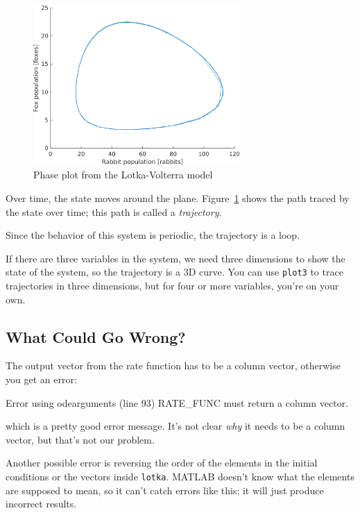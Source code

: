 \begin{figure}[ht]
\centerline{\includegraphics[width=0.7\textwidth]{../code/chap_matrices/lotka_state.png}}
\caption{Phase plot from the Lotka-Volterra model}
\label{fig:phase}
\end{figure}


Over time, the state moves around the plane. Figure~\ref{fig:phase} shows
the path traced by the state over time; this path
is called a \emph{trajectory}.

Since the behavior of this system is periodic, the trajectory is a loop.

If there are three variables in the system, we need three dimensions to show
the state of the system, so the trajectory is a 3D curve.
You can use \lstinline{plot3} to trace trajectories in three dimensions,
but for four or more variables, you're on your own.



\subsection{What Could Go Wrong?}

The output vector from the rate function has to be a column vector, otherwise you get an error:

\begin{code}
Error using odearguments (line 93)
RATE_FUNC must return a column vector.
\end{code}
which is a pretty good error message.  It's not clear \emph{why}
it needs to be a column vector, but that's not our problem.


Another possible error is reversing the order of the elements in the
initial conditions or the vectors inside \lstinline{lotka}.  MATLAB
doesn't know what the elements are supposed to mean, so it can't catch
errors like this; it will just produce incorrect results.

